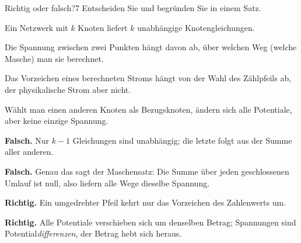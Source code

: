 \documentclass[11pt,a4paper]{article}
\begin{document}
\begin{aufgabe}{Richtig oder falsch?}{7}
Entscheiden Sie und begründen Sie in einem Satz.
\begin{teilaufgaben}
  \item Ein Netzwerk mit $k$ Knoten liefert $k$ unabhängige Knotengleichungen.
  \item Die Spannung zwischen zwei Punkten hängt davon ab, über welchen Weg (welche Masche) man sie berechnet.
  \item Das Vorzeichen eines berechneten Stroms hängt von der Wahl des Zählpfeils ab, der physikalische Strom aber nicht.
  \item Wählt man einen anderen Knoten als Bezugsknoten, ändern sich alle Potentiale, aber keine einzige Spannung.
\end{teilaufgaben}
\end{aufgabe}

\begin{loesung}
\begin{teilaufgaben}
  \item \textbf{Falsch.} Nur $k-1$ Gleichungen sind unabhängig; die letzte folgt aus der Summe aller anderen.
  \item \textbf{Falsch.} Genau das sagt der Maschensatz: Die Summe über jeden geschlossenen Umlauf ist null, also liefern alle Wege dieselbe Spannung.
  \item \textbf{Richtig.} Ein umgedrehter Pfeil kehrt nur das Vorzeichen des Zahlenwerts um.
  \item \textbf{Richtig.} Alle Potentiale verschieben sich um denselben Betrag; Spannungen sind Potential\emph{differenzen}, der Betrag hebt sich heraus.
\end{teilaufgaben}
\end{loesung}
\end{document}
